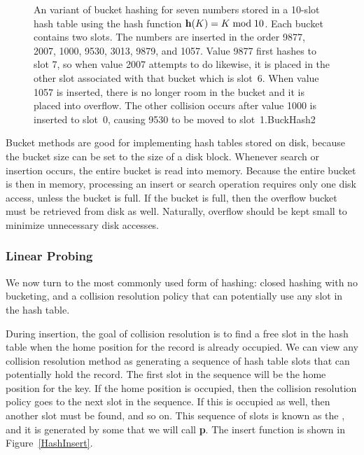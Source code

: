 \begin{figure}
\vspace{-\medskipamount}
{An variant of bucket hashing for seven numbers stored in a
10-slot hash table using the hash function
\( {\bf h}(K) = K \bmod 10\). 
Each bucket contains two slots.
The numbers are inserted in the order 9877, 2007, 1000, 9530, 3013,
9879, and 1057.
Value 9877 first hashes to slot 7, so when value 2007 attempts to do
likewise, it is placed in the other slot associated with that bucket
which is slot~6.
When value 1057 is inserted, there is no longer room in the bucket and
it is placed into overflow.
The other collision occurs after value 1000 is inserted to slot~0,
causing 9530 to be moved to slot~1.}{BuckHash2}
\medskip\medskip
\end{figure}

Bucket methods are good for implementing hash tables stored on disk,
because the bucket size can be set to the size of a disk block.
Whenever search or insertion occurs, the entire bucket is read
into memory.
Because the entire bucket is then in memory, processing an insert or
search operation requires only one disk access,
unless the bucket is full.
If the bucket is full, then the overflow bucket must be retrieved
from disk as well.
Naturally, overflow should be kept small to minimize unnecessary disk
accesses.


\subsubsection{Linear Probing}

We now turn to the most commonly used form of hashing:
closed hashing with no bucketing, and a collision resolution policy
that can potentially use any slot in the hash table.

During insertion, the goal of collision resolution is to find a free
slot in the hash table when the home position for the record is
already occupied.
We can view any collision resolution method as generating a sequence
of hash table slots that can potentially hold the record.
The first slot in the sequence will be the home position for the key.
If the home position is occupied, then the collision resolution policy
goes to the next slot in the sequence.
If this is occupied as well, then another slot must be found, and
so on.
This sequence of slots is known as the
,
and it is generated by some  that we will call
\textbf{p}.
The insert function is shown in Figure~\ref{HashInsert}.


